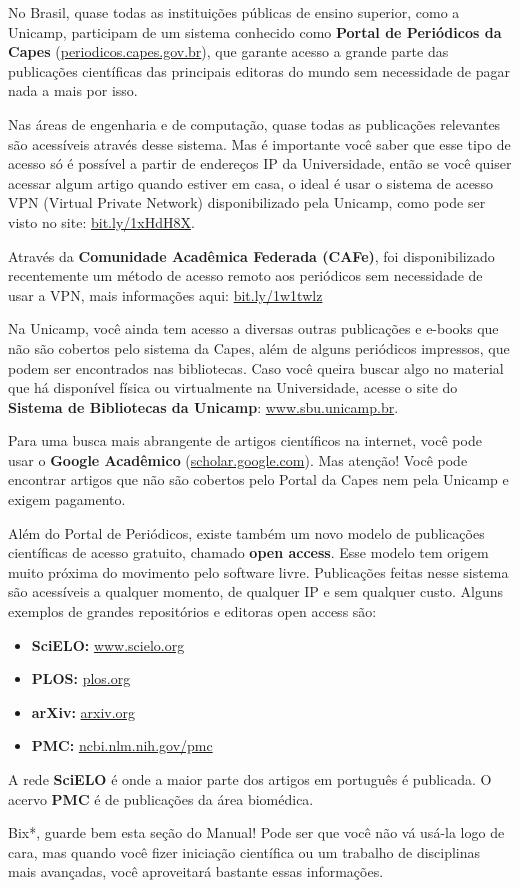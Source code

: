 No Brasil, quase todas as instituições públicas de ensino superior, como a
Unicamp, participam de um sistema conhecido como \textbf{Portal de Periódicos da
Capes} (\url{periodicos.capes.gov.br}), que garante acesso a grande parte das
publicações científicas das principais editoras do mundo sem necessidade de
pagar nada a mais por isso.

Nas áreas de engenharia e de computação, quase todas as publicações relevantes
são acessíveis através desse sistema. Mas é importante você saber que esse tipo
de acesso só é possível a partir de endereços IP da Universidade, então se você
quiser acessar algum artigo quando estiver em casa, o ideal é usar o sistema de
acesso VPN (Virtual Private Network) disponibilizado pela Unicamp, como pode ser
visto no site: \url{bit.ly/1xHdH8X}.

Através da \textbf{Comunidade Acadêmica Federada (CAFe)}, foi disponibilizado
recentemente um método de acesso remoto aos periódicos sem necessidade de usar a
VPN, mais informações aqui: \url{bit.ly/1w1twlz}

Na Unicamp, você ainda tem acesso a diversas outras publicações e e-books que
não são cobertos pelo sistema da Capes, além de alguns periódicos impressos, que
podem ser encontrados nas bibliotecas. Caso você queira buscar algo no material
que há disponível física ou virtualmente na Universidade, acesse o site do
\textbf{Sistema de Bibliotecas da Unicamp}: \url{www.sbu.unicamp.br}.

Para uma busca mais abrangente de artigos científicos na internet, você pode
usar o \textbf{Google Acadêmico} (\url{scholar.google.com}). Mas atenção! Você
pode encontrar artigos que não são cobertos pelo Portal da Capes nem pela
Unicamp e exigem pagamento.

Além do Portal de Periódicos, existe também um novo modelo de publicações
científicas de acesso gratuito, chamado \textbf{open access}. Esse modelo tem
origem muito próxima do movimento pelo software livre. Publicações feitas nesse
sistema são acessíveis a qualquer momento, de qualquer IP e sem qualquer custo.
Alguns exemplos de grandes repositórios e editoras open access são:

\begin{itemize}
    \item  \textbf{SciELO:} \url{www.scielo.org}
    \item  \textbf{PLOS:} \url{plos.org}
    \item  \textbf{arXiv:} \url{arxiv.org}
    \item  \textbf{PMC:} \url{ncbi.nlm.nih.gov/pmc}
\end{itemize}

A rede \textbf{SciELO} é onde a maior parte dos artigos em português é
publicada. O acervo \textbf{PMC} é de publicações da área biomédica.

Bix*, guarde bem esta seção do Manual! Pode ser que você não vá usá-la logo de
cara, mas quando você fizer iniciação científica ou um trabalho de disciplinas
mais avançadas, você aproveitará bastante essas informações.
